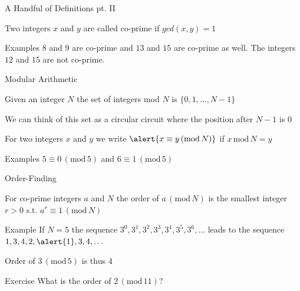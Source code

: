 \documentclass{beamer}
\begin{document}
\begin{frame}{A Handful of Definitions pt. II}

        \begin{definition}
                Two integers $x$ and $y$ are called
                \alert{co-prime} if $gcd(x,y) = 1$
        \end{definition}

        \begin{block}{Examples}
                $8$ and $9$ are co-prime and $13$ and $15$
                are co-prime as well. The integers $12$ and
                $15$ are not co-prime.
        \end{block}
\end{frame}

\begin{frame}{Modular Arithmetic}
        \begin{definition}
                Given an integer $N$ the set of \alert{integers mod $N$} is $\{
                0, 1, \dots, N - 1 \}$
        \end{definition}
        We can think of this set as a \alert{circular} circuit where the
        position after $N-1$ is $0$

        \begin{definition}
                For two integers $x$ and $y$ we write $\alert{x \equiv y \,
                (\mathrm{mod} \, N)}$ if $x \, \mathrm{mod} \, N = y$ 
        \end{definition}

        \begin{block}{Examples}
                $5 \equiv 0 \, (\mathrm{mod} \, 5)$ and
                $6 \equiv 1 \, (\mathrm{mod} \, 5)$
        \end{block}
\end{frame}

\begin{frame}{Order-Finding}

        \begin{definition}
                For co-prime integers $a$ and $N$ the \alert{order of $a \,
                (\mathrm{mod} \, N)$} is the smallest integer $r > 0$ s.t.
                $a^r \equiv 1 \, (\mathrm{mod} \, N)$
        \end{definition}

        \begin{block}{Example}
                If $N = 5$ the sequence $3^0, 3^1, 3^2, 3^3, 3^4, 3^5, 3^6,
                \dots$ leads to the sequence $1, 3, 4, 2, \alert{1}, 3, 4,
                \dots$ 

                Order of $3 \, (\mathrm{mod} \, 5)$ is thus $4$
        \end{block}

        \begin{block}{Exercise}
                What is the order of $2 \, (\mathrm{mod} \, 11)$?
        \end{block}
\end{frame}
\end{document}
